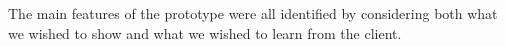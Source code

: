 The main features of the prototype were all identified by considering both what we wished to show
and what we wished to learn from the client.